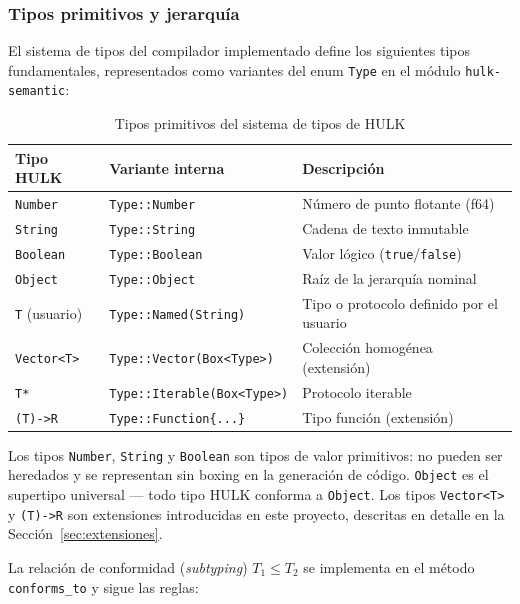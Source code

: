 \documentclass[12pt, a4paper]{article}
\begin{document}
\subsubsection{Tipos primitivos y jerarquía}

El sistema de tipos del compilador implementado define los siguientes tipos
fundamentales, representados como variantes del enum \texttt{Type} en el módulo
\texttt{hulk-semantic}:

\begin{table}[h!]
\centering
\caption{Tipos primitivos del sistema de tipos de HULK}
\label{tab:types}
\begin{tabular}{@{}lll@{}}
\toprule
\textbf{Tipo HULK} & \textbf{Variante interna} & \textbf{Descripción} \\
\midrule
\texttt{Number}   & \texttt{Type::Number}   & Número de punto flotante (f64) \\
\texttt{String}   & \texttt{Type::String}   & Cadena de texto inmutable \\
\texttt{Boolean}  & \texttt{Type::Boolean}  & Valor lógico (\texttt{true}/\texttt{false}) \\
\texttt{Object}   & \texttt{Type::Object}   & Raíz de la jerarquía nominal \\
\texttt{T} (usuario) & \texttt{Type::Named(String)} & Tipo o protocolo definido por el usuario \\
\texttt{Vector<T>} & \texttt{Type::Vector(Box<Type>)} & Colección homogénea (extensión) \\
\texttt{T*}       & \texttt{Type::Iterable(Box<Type>)} & Protocolo iterable \\
\texttt{(T)->R}   & \texttt{Type::Function\{...\}} & Tipo función (extensión) \\
\bottomrule
\end{tabular}
\end{table}

Los tipos \texttt{Number}, \texttt{String} y \texttt{Boolean} son tipos de
valor primitivos: no pueden ser heredados y se representan sin boxing en la
generación de código. \texttt{Object} es el supertipo universal — todo tipo
HULK conforma a \texttt{Object}. Los tipos \texttt{Vector<T>} y
\texttt{(T)->R} son extensiones introducidas en este proyecto, descritas en
detalle en la Sección~\ref{sec:extensiones}.

La relación de conformidad (\textit{subtyping}) $T_1 \leq T_2$ se implementa
en el método \texttt{conforms\_to} y sigue las reglas:
\end{document}
